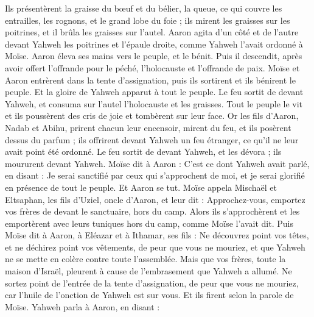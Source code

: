 \begin{multicols}{2}
Ils présentèrent la graisse du bœuf et du bélier, la queue, ce qui couvre les entrailles, les rognons, et le grand lobe du foie ;
ils mirent les graisses sur les poitrines, et il brûla les graisses sur l'autel.
Aaron agita d’un côté et de l’autre devant Yahweh les poitrines et l'épaule droite, comme Yahweh l'avait ordonné à Moïse.
Aaron éleva ses mains vers le peuple, et le bénit. Puis il descendit, après avoir offert l'offrande pour le péché, l'holocauste et l’offrande de paix.
Moïse et Aaron entrèrent dans la tente d'assignation, puis ils sortirent et ils bénirent le peuple. Et la gloire de Yahweh apparut à tout le peuple.
Le feu sortit de devant Yahweh, et consuma sur l'autel l'holocauste et les graisses. Tout le peuple le vit et ils poussèrent des cris de joie et tombèrent sur leur face.
\VerseOne{}Or les fils d'Aaron, Nadab et Abihu, prirent chacun leur encensoir, mirent du feu, et ils posèrent dessus du parfum ; ils offrirent devant Yahweh un feu étranger, ce qu'il ne leur avait point été ordonné.
Le feu sortit de devant Yahweh, et les dévora ; ils moururent devant Yahweh.
Moïse dit à Aaron : C'est ce dont Yahweh avait parlé, en disant : Je serai sanctifié par ceux qui s'approchent de moi, et je serai glorifié en présence de tout le peuple. Et Aaron se tut.
Moïse appela Mischaël et Eltsaphan, les fils d’Uziel, oncle d'Aaron, et leur dit : Approchez-vous, emportez vos frères de devant le sanctuaire, hors du camp.
Alors ils s'approchèrent et les emportèrent avec leurs tuniques hors du camp, comme Moïse l’avait dit.
Puis Moïse dit à Aaron, à Eléazar et à Ithamar, ses fils : Ne découvrez point vos têtes, et ne déchirez point vos vêtements, de peur que vous ne mouriez, et que Yahweh ne se mette en colère contre toute l'assemblée. Mais que vos frères, toute la maison d'Israël, pleurent à cause de l'embrasement que Yahweh a allumé.
Ne sortez point de l'entrée de la tente d'assignation, de peur que vous ne mouriez, car l'huile de l'onction de Yahweh est sur vous. Et ils firent selon la parole de Moïse.
Yahweh parla à Aaron, en disant :

\end{multicols}
